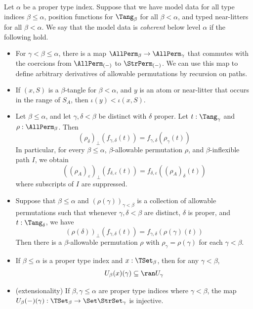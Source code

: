 \begin{definition}
  \label{def:CoherentData}
  \leanok
  Let \( \alpha \) be a proper type index.
  Suppose that we have model data for all type indices \( \beta \leq \alpha \), position functions for \( \Tang_\beta \) for all \( \beta < \alpha \), and typed near-litters for all \( \beta < \alpha \).
  We say that the model data is \emph{coherent} below level \( \alpha \) if the following hold.
  \begin{itemize}
    \item For \( \gamma < \beta \leq \alpha \), there is a map \( \AllPerm_\beta \to \AllPerm_\gamma \) that commutes with the coercions from \( \AllPerm_{(-)} \) to \( \StrPerm_{(-)} \).
    We can use this map to define arbitrary derivatives of allowable permutations by recursion on paths.
    \item If \( (x, S) \) is a \( \beta \)-tangle for \( \beta < \alpha \), and \( y \) is an atom or near-litter that occurs in the range of \( S_A \), then \( \iota(y) < \iota(x, S) \).
    \item Let \( \beta \leq \alpha \), and let \( \gamma, \delta < \beta \) be distinct with \( \delta \) proper.
    Let \( t : \Tang_\gamma \) and \( \rho : \AllPerm_\beta \).
    Then
    \[ (\rho_\delta)_\bot(f_{\gamma,\delta}(t)) = f_{\gamma,\delta}(\rho_\gamma(t)) \]
    In particular, for every \( \beta \leq \alpha \), \( \beta \)-allowable permutation \( \rho \), and \( \beta \)-inflexible path \( I \), we obtain
    \[ ((\rho_A)_\varepsilon)_\bot(f_{\delta,\varepsilon}(t)) = f_{\delta,\varepsilon}((\rho_A)_\delta(t)) \]
    where subscripts of \( I \) are suppressed.
    \item Suppose that \( \beta \leq \alpha \) and \( (\rho(\gamma))_{\gamma < \beta} \) is a collection of allowable permutations such that whenever \( \gamma, \delta < \beta \) are distinct, \( \delta \) is proper, and \( t : \Tang_\delta \), we have
    \[ (\rho(\delta))_\bot(f_{\gamma,\delta}(t)) = f_{\gamma,\delta}(\rho(\gamma)(t)) \]
    Then there is a \( \beta \)-allowable permutation \( \rho \) with \( \rho_\gamma = \rho(\gamma) \) for each \( \gamma < \beta \).
    \item If \( \beta \leq \alpha \) is a proper type index and \( x : \TSet_\beta \), then for any \( \gamma < \beta \),
    \[ U_\beta(x)(\gamma) \subseteq \ran U_\gamma \]
    \item (extensionality) If \( \beta, \gamma \leq \alpha \) are proper type indices where \( \gamma < \beta \), the map \( U_\beta(-)(\gamma) : \TSet_\beta \to \Set \StrSet_\gamma \) is injective.

\end{itemize}
\end{definition}
